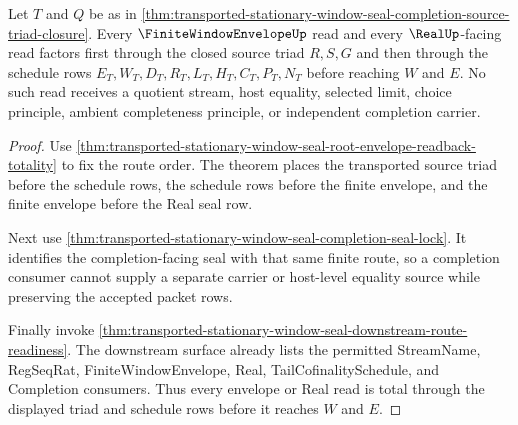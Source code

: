\begin{theorem}
\label{thm:transported-stationary-window-seal-envelope-real-row-totality}
Let $T$ and $Q$ be as in \autoref{thm:transported-stationary-window-seal-completion-source-triad-closure}. Every $\FiniteWindowEnvelopeUp$ read and every $\RealUp$-facing read factors first through the closed source triad $R,S,G$ and then through the schedule rows $E_T,W_T,D_T,R_T,L_T,H_T,C_T,P_T,N_T$ before reaching $W$ and $E$. No such read receives a quotient stream, host equality, selected limit, choice principle, ambient completeness principle, or independent completion carrier.
\end{theorem}
\begin{proof}
Use \autoref{thm:transported-stationary-window-seal-root-envelope-readback-totality} to fix the route order. The theorem places the transported source triad before the schedule rows, the schedule rows before the finite envelope, and the finite envelope before the Real seal row.

Next use \autoref{thm:transported-stationary-window-seal-completion-seal-lock}. It identifies the completion-facing seal with that same finite route, so a completion consumer cannot supply a separate carrier or host-level equality source while preserving the accepted packet rows.

Finally invoke \autoref{thm:transported-stationary-window-seal-downstream-route-readiness}. The downstream surface already lists the permitted StreamName, RegSeqRat, FiniteWindowEnvelope, Real, TailCofinalitySchedule, and Completion consumers. Thus every envelope or Real read is total through the displayed triad and schedule rows before it reaches $W$ and $E$.
\end{proof}

